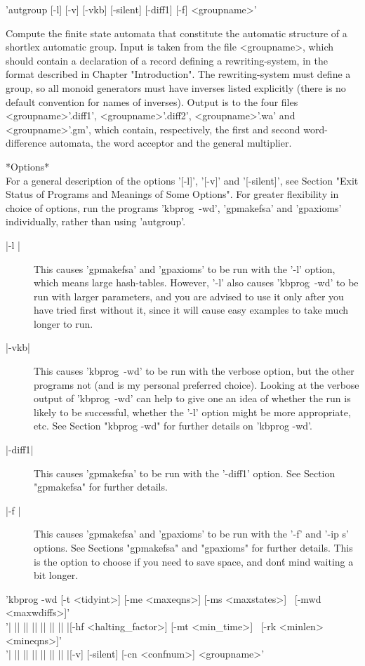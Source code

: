 'autgroup  [-l] [-v] [-vkb] [-silent] [-diff1] [-f] <groupname>'

Compute the finite state automata that constitute the automatic structure
of a shortlex automatic group. Input is taken from the file <groupname>,
which should contain a declaration of a record defining a rewriting-system, in
the format described in Chapter "Introduction". The rewriting-system must
define a group, so all monoid generators must have inverses listed explicitly
(there is no default convention for names of inverses). Output is to the
four files <groupname>'.diff1', <groupname>'.diff2', <groupname>'.wa' and
<groupname>'.gm', which contain, respectively, the first and second
word-difference automata, the word acceptor and the general multiplier.

*Options*\\
For a general description of the options '[-l]', '[-v]' and '[-silent]',
see Section
"Exit Status of Programs and Meanings of Some Options".
For greater flexibility in choice of options, run the programs 'kbprog\ -wd',
'gpmakefsa' and 'gpaxioms' individually, rather than using 'autgroup'. 

\begin{description}
\item[|-l |]
This causes 'gpmakefsa' and 'gpaxioms' to be run with the '-l' option, which
means large hash-tables. However, '-l' also causes 'kbprog\ -wd' to be run
with larger parameters, and you are advised to use it only after you
have tried first without it, since it will cause easy examples to take
much longer to run.
\item[|-vkb|]
This causes 'kbprog\ -wd' to be run with the verbose option, but the other
programs not (and is my personal preferred choice). Looking at the
verbose output of 'kbprog\ -wd' can help to give one an idea of whether the run
is likely to be successful, whether the '-l' option might be
more appropriate, etc. See Section "kbprog -wd" for further details on
'kbprog -wd'.
\item[|-diff1|]
This causes 'gpmakefsa' to be run with the '-diff1' option. See Section
"gpmakefsa" for further details.
\item[|-f |] This causes 'gpmakefsa' and 'gpaxioms' to be run with the
'-f' and '-ip s' options. See Sections "gpmakefsa" and "gpaxioms" for
further details. This is the option to choose if you need to save space,
and don\'t mind waiting a bit longer.
\end{description}
'kbprog -wd [-t <tidyint>] [-me <maxeqns>] [-ms <maxstates>] \
[-mwd <maxwdiffs>]'\\
'| || || || || || || |[-hf <halting\_factor>] [-mt <min\_time>] \
[-rk <minlen> <mineqns>]'\\
'| || || || || || || |[-v] [-silent] [-cn <confnum>] <groupname>'

